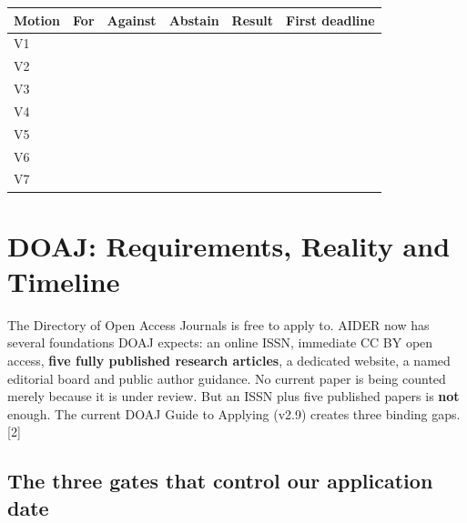 \documentclass[11pt]{article}
\newcommand{\src}[1]{{\footnotesize\color{ink3}[#1]}}
\begin{document}
\begin{center}\small\sffamily
\begin{tabular}{@{}p{1.1cm}p{2cm}p{2cm}p{2cm}p{2cm}p{3.4cm}@{}}
\toprule
\textbf{Motion} & \textbf{For} & \textbf{Against} & \textbf{Abstain} & \textbf{Result} & \textbf{First deadline} \\
\midrule
V1 & & & & & \\[7pt]
V2 & & & & & \\[7pt]
V3 & & & & & \\[7pt]
V4 & & & & & \\[7pt]
V5 & & & & & \\[7pt]
V6 & & & & & \\[7pt]
V7 & & & & & \\[7pt]
\bottomrule
\end{tabular}
\end{center}

\section{DOAJ: Requirements, Reality and Timeline}

The Directory of Open Access Journals is free to apply to. AIDER now has several foundations DOAJ expects: an online ISSN, immediate CC BY open access, \textbf{five fully published research articles}, a dedicated website, a named editorial board and public author guidance. No current paper is being counted merely because it is under review. But an ISSN plus five published papers is \textbf{not} enough. The current DOAJ Guide to Applying (v2.9) creates three binding gaps. \src{2}

\subsection{The three gates that control our application date}
\end{document}
